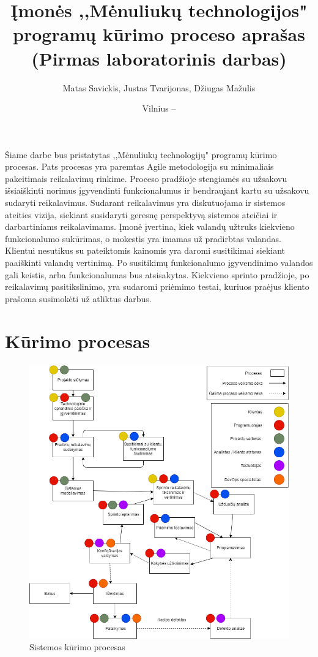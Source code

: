 \documentclass{VUMIFPSkursinis}
\title{Įmonės ,,Mėnuliukų technologijos" programų kūrimo proceso aprašas (Pirmas laboratorinis darbas)}
\author{Matas Savickis, Justas Tvarijonas, Džiugas Mažulis}
\date{Vilnius – \the\year}
\begin{document}
\maketitle

\tableofcontents

	Šiame darbe bus pristatytas ,,Mėnuliukų technologijų" programų kūrimo procesas.
	Pats procesas yra paremtas Agile metodologija su minimaliais pakeitimais reikalavimų rinkime.
	Proceso pradžioje stengiamės su užsakovu išsiaiškinti norimus įgyvendinti funkcionalumus ir bendraujant kartu su užsakovu sudaryti reikalavimus. 
	Sudarant reikalavimus yra diskutuojama ir sistemos ateities vizija, siekiant susidaryti geresnę perspektyvą sistemos ateičiai ir darbartiniams reikalavimams.
	Įmonė įvertina, kiek valandų užtruks kiekvieno funkcionalumo sukūrimas, o mokestis yra imamas už pradirbtas valandas.
	Klientui nesutikus su pateiktomis kainomis yra daromi susitikimai siekiant paaiškinti valandų vertinimą. Po susitikimų funkcionalumo įgyvendinimo valandos gali keistis, arba funkcionalumas bus atsisakytas. 
	Kiekvieno sprinto pradžioje, po reikalavimų pasitikslinimo, yra sudaromi priėmimo testai, kuriuos praėjus kliento prašoma susimokėti už atliktus darbus.

\section{Kūrimo procesas}
	\begin{figure}[htbp]
	\includegraphics[scale=0.6]{img/SoftwareProcessMoonTechnologies}
	\caption{Sistemos kūrimo procesas} %
	\label{img:kurimoProcesas}
	\end{figure}
\end{document}
